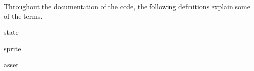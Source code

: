 
Throughout the documentation of the code, the following definitions explain
some of the terms.


\begin{definition}
    \item[state]{}
    \item[sprite]{}
    \item[asset]{}
\end{definition}
